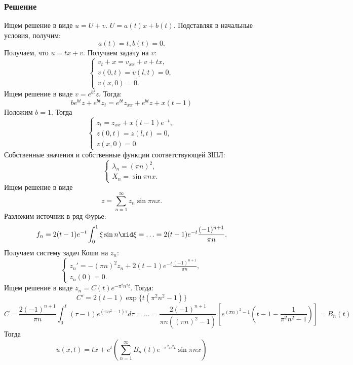 \documentclass[11pt]{article}
\begin{document}
\subsubsection{Решение}
\label{sec:orgd790623}
Ищем решение в виде $u = U + v$. $U = a(t)x + b(t)$. Подставляя в начальные условия, получим:
\begin{equation}
a(t) = t, b(t) = 0.
\end{equation}
Получаем, что $u = tx + v$. Получаем задачу на $v$:
\begin{equation}
\begin{cases}
v_t + x = v_{xx} + v + tx, \\
v(0, t) = v(l, t) = 0, \\
v(x, 0) = 0.
\end{cases}
\end{equation}
Ищем решение в виде $v = e^{bt}z$. Тогда:
\begin{equation}
be^{bt}z + e^{bt}z_t = e^{bt}z_{xx} + e^{bt}z + x(t - 1)
\end{equation}
Положим $b = 1$. Тогда
\begin{equation}
\begin{cases}
z_t = z_{xx} + x(t - 1)e^{-t}, \\
z(0, t) = z(l, t) = 0, \\
z(x, 0) = 0.
\end{cases}
\end{equation}
Собственные значения и собственные функции соответствующей ЗШЛ:
\begin{equation}
\begin{cases}
\lambda_n = (\pi n)^2, \\
X_n = \sin\pi nx.
\end{cases}
\end{equation}
Ищем решение в виде
\begin{equation}
z = \sum_{n = 1}^{\infty}z_n\sin\pi nx.
\end{equation}
Разложим источник в ряд Фурье:
\begin{equation}
f_n = 2(t - 1)e^{-t}\int_0^1\xi\sin n\xid\xi = \ldots = 2(t - 1)e^{-t}\frac{(-1)^{n + 1}}{\pi n}.
\end{equation}
Получаем систему задач Коши на $z_n$:
\begin{equation}
\begin{cases}
z_n' = -(\pi n)^2z_n + 2(t - 1)e^{-t}\frac{(-1)^{n + 1}}{\pi n}, \\
z_n(0) = 0.
\end{cases}
\end{equation}
Ищем решение в виде $z_n = C(t)e^{-\pi^2n^2t}$. Тогда:
\begin{equation}
C' = 2(t - 1)\exp\{t(\pi^2n^2 - 1)\}
\end{equation}
\begin{equation}
C = \frac{2(-1)^{n + 1}}{\pi n}\int_0^t(\tau - 1)e^{(\pi n^2 - 1)\tau}d\tau = \ldots =
\frac{2(-1)^{n + 1}}{\pi n((\pi n)^2 - 1)}\left[e^{(\pi n)^2 - 1}\left(t - 1 - \frac1{\pi^2n^2 - 1}\right)\right]
= B_n(t)
\end{equation}
Тогда
\begin{equation}
u(x, t) = tx + e^t\left(\sum_{n = 1}^{\infty}B_n(t)e^{-\pi^2n^2t}\sin\pi nx\right)
\end{equation}
\end{document}
